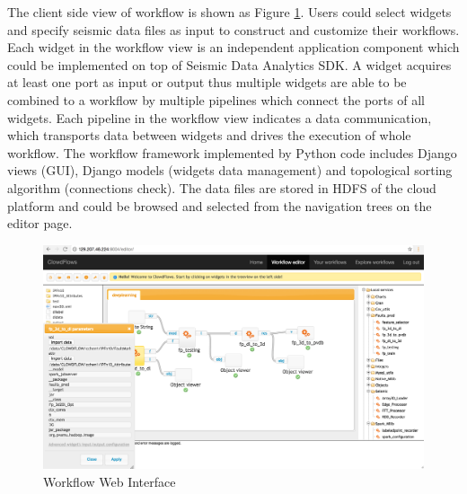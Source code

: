 The client side view of workflow is shown as Figure \ref{workflow}. Users could select widgets and specify seismic data files as input to construct and customize their workflows. Each widget in the workflow view is an independent application component which could be implemented on top of Seismic Data Analytics SDK. A widget acquires at least one port as input or output thus multiple widgets are able to be combined to a workflow by multiple pipelines which connect the ports of all widgets. Each pipeline in the workflow view indicates a data communication, which transports data between widgets and drives the execution of whole workflow. The workflow framework implemented by Python code includes Django views (GUI), Django models (widgets data management) and topological sorting algorithm (connections check).  The data files are stored in HDFS of the cloud platform and could be browsed and selected from the navigation trees on the editor page.

\begin{figure}[h]
\centering
\includegraphics[scale=0.3]{figures/workflow.png}
\caption{Workflow Web Interface}
\label{workflow}
\end{figure}

